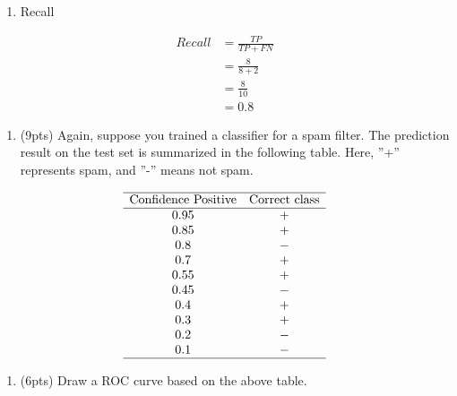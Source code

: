 \documentclass[11pt]{article}
\providecommand{\tightlist}{%
      \setlength{\itemsep}{0pt}\setlength{\parskip}{0pt}}
\begin{document}
    \begin{enumerate}
\def\labelenumi{(\alph{enumi})}
\setcounter{enumi}{2}
\tightlist
\item
  Recall
\end{enumerate}

\[
\begin{align}
Recall &= \frac{TP}{TP + FN} \\
&= \frac{8}{8 + 2} \\
&= \frac{8}{10} \\
&= 0.8
\end{align}
\]

    \begin{enumerate}
\def\labelenumi{\arabic{enumi}.}
\setcounter{enumi}{4}
\tightlist
\item
  (9pts) Again, suppose you trained a classifier for a spam filter. The
  prediction result on the test set is summarized in the following
  table. Here, ''+'' represents spam, and ''-'' means not spam.
\end{enumerate}

\[
\begin{array}{cccc}
\hline
\text{Confidence Positive} & \text{Correct class} \\
\hline
0.95 & + \\
0.85 & + \\
0.8 & - \\
0.7 & + \\
0.55 & + \\
0.45 & - \\
0.4 & + \\
0.3 & + \\
0.2 & - \\
0.1 & - \\
\hline
\end{array}
\]

\begin{enumerate}
\def\labelenumi{(\alph{enumi})}
\tightlist
\item
  (6pts) Draw a ROC curve based on the above table.
\end{enumerate}
\end{document}
